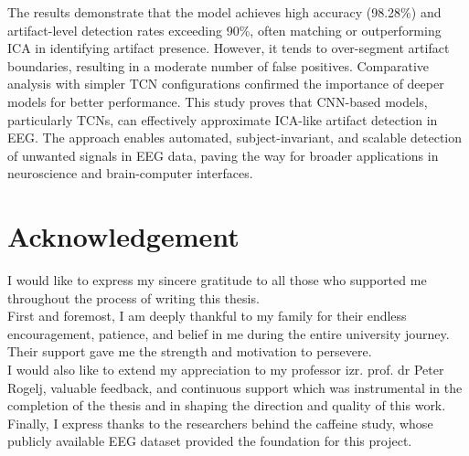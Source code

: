 \documentclass[12pt,a4paper,titlepage,openany]{report}
\begin{document}
\begin{center}
{{The results demonstrate that the model achieves high accuracy (98.28\%) and artifact-level detection rates exceeding 90\%, often matching or outperforming ICA in identifying artifact presence. However, it tends to over-segment artifact boundaries, resulting in a moderate number of false positives. Comparative analysis with simpler TCN configurations confirmed the importance of deeper models for better performance.
This study proves that CNN-based models, particularly TCNs, can effectively approximate ICA-like artifact detection in EEG. The approach enables automated, subject-invariant, and scalable detection of unwanted signals in EEG data, paving the way for broader applications in neuroscience and brain-computer interfaces.
\vspace{0.2cm}
}}
\end{center}





\newpage
\section*{Acknowledgement}
I would like to express my sincere gratitude to all those who supported me throughout the process of writing this thesis.\\
First and foremost, I am deeply thankful to my family for their endless encouragement, patience, and belief in me during the entire university journey. Their support gave me the strength and motivation to persevere.\\
I would also like to extend my appreciation to my professor izr. prof. dr Peter Rogelj, valuable feedback, and continuous support which was instrumental in the completion of the thesis and in shaping the direction and quality of this work.\\
Finally, I express thanks to the researchers behind the caffeine study, whose publicly available EEG dataset provided the foundation for this project.

\newpage

\tableofcontents
{}
\newpage
\listoftables
{}
\newpage
\listoffigures
{}
\newpage
\end{document}
